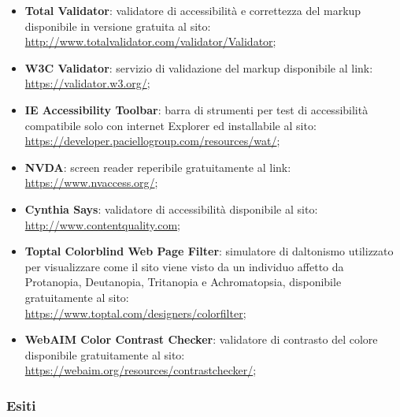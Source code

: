 \documentclass[12pt]{article}
\begin{document}
	\begin{itemize}
		\item \textbf{Total Validator}: validatore di accessibilità e correttezza del markup disponibile in versione gratuita al sito:
		\\ \url{http://www.totalvalidator.com/validator/Validator};
		
		\item \textbf{W3C Validator}: servizio di validazione del markup disponibile al link:
		\\ \url{https://validator.w3.org/};
		
		\item \textbf{IE Accessibility Toolbar}: barra di strumenti per test di accessibilità compatibile solo con internet Explorer ed installabile al sito:
		\\ \url{https://developer.paciellogroup.com/resources/wat/};
		
		\item \textbf{NVDA}: screen reader reperibile gratuitamente al link:
		\\ \url{https://www.nvaccess.org/};
		
		\item \textbf{Cynthia Says}: validatore di accessibilità disponibile al sito: 
		\\ \url{http://www.contentquality.com};
		
		\item \textbf{Toptal Colorblind Web Page Filter}: simulatore di daltonismo utilizzato per visualizzare come il sito viene visto da un individuo affetto da Protanopia, Deutanopia, Tritanopia e Achromatopsia, disponibile gratuitamente al sito: 
		\\ \url{https://www.toptal.com/designers/colorfilter};
		
		\item \textbf{WebAIM Color Contrast Checker}: validatore di contrasto del colore disponibile gratuitamente al sito: 
		\\ \url{https://webaim.org/resources/contrastchecker/};
	\end{itemize}
	
	\subsubsection{Esiti}
	
\end{document}
